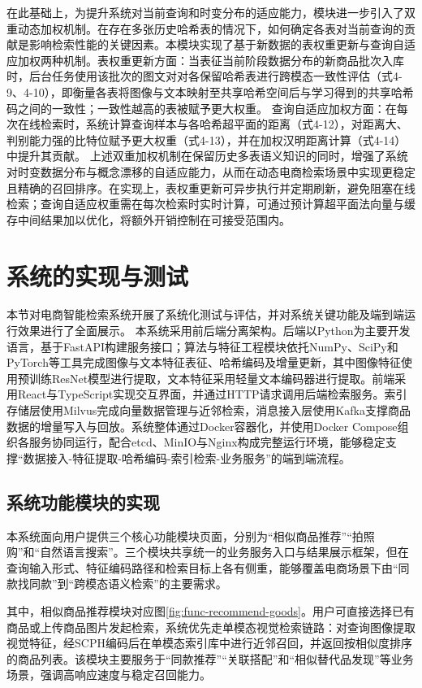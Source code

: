 在此基础上，为提升系统对当前查询和时变分布的适应能力，模块进一步引入了双重动态加权机制。在存在多张历史哈希表的情况下，如何确定各表对当前查询的贡献是影响检索性能的关键因素。本模块实现了基于新数据的表权重更新与查询自适应加权两种机制。表权重更新方面：当表征当前阶段数据分布的新商品批次入库时，后台任务使用该批次的图文对对各保留哈希表进行跨模态一致性评估（式4-9、4-10），即衡量各表将图像与文本映射至共享哈希空间后与学习得到的共享哈希码之间的一致性；一致性越高的表被赋予更大权重。
查询自适应加权方面：在每次在线检索时，系统计算查询样本与各哈希超平面的距离（式4-12），对距离大、判别能力强的比特位赋予更大权重（式4-13），并在加权汉明距离计算（式4-14）中提升其贡献。
上述双重加权机制在保留历史多表语义知识的同时，增强了系统对时变数据分布与概念漂移的自适应能力，从而在动态电商检索场景中实现更稳定且精确的召回排序。在实现上，表权重更新可异步执行并定期刷新，避免阻塞在线检索；查询自适应权重需在每次检索时实时计算，可通过预计算超平面法向量与缓存中间结果加以优化，将额外开销控制在可接受范围内。

\section{系统的实现与测试}
\label{sec:chap05-impl}

本节对电商智能检索系统开展了系统化测试与评估，并对系统关键功能及端到端运行效果进行了全面展示。
本系统采用前后端分离架构。后端以Python为主要开发语言，基于FastAPI构建服务接口；算法与特征工程模块依托NumPy、SciPy和PyTorch等工具完成图像与文本特征表征、哈希编码及增量更新，其中图像特征使用预训练ResNet模型进行提取，文本特征采用轻量文本编码器进行提取。前端采用React与TypeScript实现交互界面，并通过HTTP请求调用后端检索服务。索引存储层使用Milvus完成向量数据管理与近邻检索，消息接入层使用Kafka支撑商品数据的增量写入与回放。系统整体通过Docker容器化，并使用Docker Compose组织各服务协同运行，配合etcd、MinIO与Nginx构成完整运行环境，能够稳定支撑“数据接入-特征提取-哈希编码-索引检索-业务服务”的端到端流程。

\subsection{系统功能模块的实现}

本系统面向用户提供三个核心功能模块页面，分别为“相似商品推荐”“拍照购”和“自然语言搜索”。三个模块共享统一的业务服务入口与结果展示框架，但在查询输入形式、特征编码路径和检索目标上各有侧重，能够覆盖电商场景下由“同款找同款”到“跨模态语义检索”的主要需求。

其中，相似商品推荐模块对应图\ref{fig:func-recommend-goods}。用户可直接选择已有商品或上传商品图片发起检索，系统优先走单模态视觉检索链路：对查询图像提取视觉特征，经SCPH编码后在单模态索引库中进行近邻召回，并返回按相似度排序的商品列表。该模块主要服务于“同款推荐”“关联搭配”和“相似替代品发现”等业务场景，强调高响应速度与稳定召回能力。

